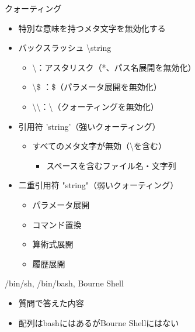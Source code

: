 \documentclass[12pt,aspectratio=169]{beamer}
\begin{document}
\begin{frame}{クォーティング}

  \begin{itemize}
    \item 特別な意味を持つメタ文字を無効化する
    \item バックスラッシュ \textbackslash string
      \begin{itemize}
        \item \textbackslash * ：アスタリスク（*、パス名展開を無効化）
        \item \textbackslash \$ ：\$（パラメータ展開を無効化）
        \item \textbackslash\textbackslash ：\textbackslash （クォーティングを無効化）
      \end{itemize}
    \item 引用符 'string'（強いクォーティング）
      \begin{itemize}
        \item すべてのメタ文字が無効（\textbackslash を含む）
          \begin{itemize}
            \item スペースを含むファイル名・文字列
          \end{itemize}
      \end{itemize}
    \item 二重引用符 "string"（弱いクォーティング）
      \begin{itemize}
        \item パラメータ展開
        \item コマンド置換
        \item 算術式展開
        \item 履歴展開
      \end{itemize}

  \end{itemize}

\end{frame}


\begin{frame}{/bin/sh, /bin/bash, Bourne Shell}

  \begin{itemize}
    \item 質問で答えた内容
    \item 配列はbashにはあるがBourne Shellにはない
  \end{itemize}

\end{frame}
\end{document}

